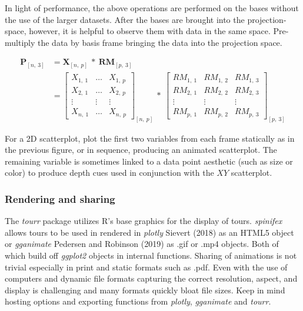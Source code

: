 In light of performance, the above operations are performed on the bases without the use of the larger datasets. After the bases are brought into the projection-space, however, it is helpful to observe them with data in the same space. Pre-multiply the data by basis frame bringing the data into the projection space.

\begin{align}
  \textbf{P}_{[n,~3]}
    &= \textbf{X}_{[n,~p]} ~*~ \textbf{RM}_{[p,~3]} \\
    &=
      \begin{bmatrix}
          X_{1,~1} & \dots & X_{1,~p} \\
          X_{2,~1} & \dots & X_{2,~p} \\
          \vdots   & \vdots & \vdots  \\
          X_{n,~1} & \dots & X_{n,~p}
      \end{bmatrix}_{[n,~p]}
      ~*~
      \begin{bmatrix}
        RM_{1,~1} & RM_{1,~2} & RM_{1,~3} \\
        RM_{2,~1} & RM_{2,~2} & RM_{2,~3} \\
        \vdots     & \vdots     & \vdots  \\
        RM_{p,~1} & RM_{p,~2} & RM_{p,~3}
      \end{bmatrix}_{[p,~3]}
\end{align}

For a 2D scatterplot, plot the first two variables from each frame statically as in the previous figure, or in sequence, producing an animated scatterplot. The remaining variable is sometimes linked to a data point aesthetic (such as size or color) to produce depth cues used in conjunction with the \(XY\) scatterplot.

\hypertarget{rendering-and-sharing}{%
\subsubsection{Rendering and sharing}\label{rendering-and-sharing}}

The \emph{tourr} package utilizes R's base graphics for the display of tours. \emph{spinifex} allows tours to be used in rendered in \emph{plotly} Sievert (2018) as an HTML5 object or \emph{gganimate} Pedersen and Robinson (2019) as .gif or .mp4 objects. Both of which build off \emph{ggplot2} objects in internal functions. Sharing of animations is not trivial especially in print and static formats such as .pdf. Even with the use of computers and dynamic file formats capturing the correct resolution, aspect, and display is challenging and many formats quickly bloat file sizes. Keep in mind hosting options and exporting functions from \emph{plotly}, \emph{gganimate} and \emph{tourr}.

